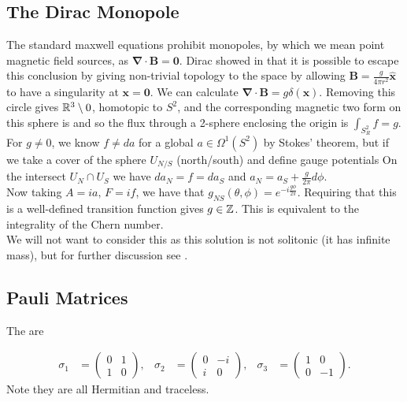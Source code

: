 \documentclass{article}
\begin{document}
\subsection{The Dirac Monopole}
The standard maxwell equations prohibit monopoles, by which we mean point magnetic field sources, as $\bm{\nabla}\cdot \bm{B}=\bm{0}$. Dirac showed in \cite{Dirac1931} that it is possible to escape this conclusion by giving non-trivial topology to the space by allowing $\bm{B} = \frac{g}{4\pi r^2}\hat{\bm{x}}$ to have a singularity at $\bm{x}=\bm{0}$. We can calculate $\bm{\nabla} \cdot \bm{B} = g\delta(\bm{x})$. Removing this circle gives $\mathbb{R}^3\setminus 0$, homotopic to $S^2$, and the corresponding magnetic two form on this sphere is
and so the flux through a 2-sphere enclosing the origin is $\int_{S_R^2} f = g $. For $g \neq 0$, we know $f \neq da$ for a global $a \in \Omega^1(S^2)$ by Stokes' theorem, but if we take a cover of the sphere $U_{N/S}$ (north/south) and define gauge potentials
On the intersect $U_N \cap U_S$ we have $da_N = f = da_S$ and $a_N = a_S + \frac{g}{2\pi}d\phi$. \\
Now taking $A = ia, \, F = if$, we have that $g_{NS}(\theta,\phi) = e^{-i\frac{g\phi}{2\pi}}$. Requiring that this is a well-defined transition function gives $g \in \mathbb{Z}$. This is equivalent to the integrality of the Chern number. \\
We will not want to consider this as this solution is not solitonic (it has infinite mass), but for further discussion see \cite{Manton2004}. 
\subsection{Pauli Matrices}

\begin{definition}
	The  are
	
	\begin{align*}
		\sigma_1 &= \begin{pmatrix} 0 & 1 \\ 1 & 0\end{pmatrix}, & 
		\sigma_2 &= \begin{pmatrix} 0 & -i \\ i & 0\end{pmatrix}, &  
		\sigma_3 &= \begin{pmatrix} 1 & 0 \\ 0 & -1\end{pmatrix}.  
	\end{align*}
	Note they are all Hermitian and traceless.
\end{definition}
\end{document}
